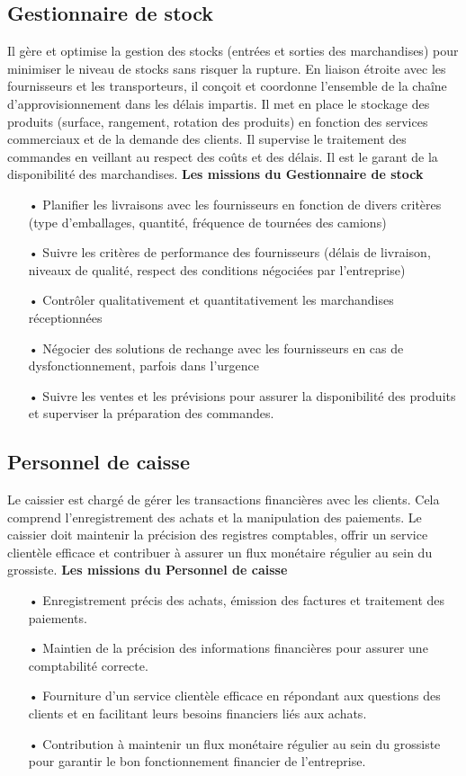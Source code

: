 \documentclass[edit,12pt,a4paper,ChapStyle,oneside,doubleinterligne]{report}
\begin{document}
\subsection{Gestionnaire de stock}
Il gère et optimise la gestion des stocks (entrées et sorties des marchandises) pour minimiser le niveau de stocks sans risquer la rupture. En liaison étroite avec les fournisseurs et les transporteurs, il conçoit et coordonne l'ensemble de la chaîne d'approvisionnement dans les délais impartis. Il met en place le stockage des produits (surface, rangement, rotation des produits) en fonction des services commerciaux et de la demande des clients. Il supervise le traitement des commandes en veillant au respect des coûts et des délais. Il est le garant de la disponibilité des marchandises.
\cite{Gestionnaire}\newline\textbf{Les missions du Gestionnaire de stock}\newline
\begin{itemize}
    \item [•] Planifier les livraisons avec les fournisseurs en fonction de divers critères (type d'emballages, quantité, fréquence de tournées des camions)
    \item [•]	Suivre les critères de performance des fournisseurs (délais de livraison, niveaux de qualité, respect des conditions négociées par l'entreprise)
    \item [•]   Contrôler qualitativement et quantitativement les marchandises réceptionnées
    \item [•]   Négocier des solutions de rechange avec les fournisseurs en cas de dysfonctionnement, parfois dans l'urgence
    \item [•]   Suivre les ventes et les prévisions pour assurer la disponibilité des produits et superviser la préparation des commandes.
\end{itemize}
\subsection{Personnel de caisse }
Le caissier est chargé de gérer les transactions financières avec les clients. Cela comprend l'enregistrement des achats et la manipulation des paiements. Le caissier doit maintenir la précision des registres comptables, offrir un service clientèle efficace et contribuer à assurer un flux monétaire régulier au sein du grossiste.
\cite{Personnel}\newline\textbf{Les missions du Personnel de caisse}\newline
\begin{itemize}
    \item [•] Enregistrement précis des achats, émission des factures et traitement des paiements.
    \item [•] Maintien de la précision des informations financières pour assurer une comptabilité correcte.
    \item [•] Fourniture d'un service clientèle efficace en répondant aux questions des clients et en facilitant leurs besoins financiers liés aux achats.
    \item [•] Contribution à maintenir un flux monétaire régulier au sein du grossiste pour garantir le bon fonctionnement financier de l'entreprise.
\end{itemize}
\end{document}
